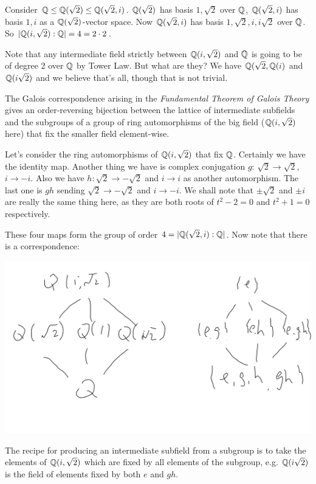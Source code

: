 \documentclass[a4paper]{article}
\begin{document}
\begin{eg}
Consider $\mathbb{Q} \leq \mathbb{Q}(\sqrt{2}) \leq \mathbb{Q}(\sqrt{2},i)$. $\mathbb{Q}(\sqrt{2})$ has basis $1,\sqrt{2}$ over $\mathbb{Q}$, $\mathbb{Q}(\sqrt{2},i)$ has basis $1,i$ as a $\mathbb{Q}(\sqrt{2})$-vector space. Now $\mathbb{Q}(\sqrt{2},i)$ has basis $1,\sqrt{2},i,i\sqrt{2}$ over $\mathbb{Q}$. So $|\mathbb{Q}(i,\sqrt{2}):\mathbb{Q}| = 4 = 2\cdot 2$.
\end{eg}

Note that any intermediate field strictly between $\mathbb{Q}(i,\sqrt{2})$ and $\mathbb{Q}$ is going to be of degree 2 over $\mathbb{Q}$ by Tower Law. But what are they? We have $\mathbb{Q}(\sqrt{2},\mathbb{Q}(i)$ and $\mathbb{Q}(i\sqrt{2})$ and we believe that's all, though that is not trivial.

The Galois correspondence arising in the \emph{Fundamental Theorem of Galois Theory} gives an order-reversing bijection between the lattice of intermediate subfields and the subgroups of a group of ring automorphisms of the big field ($\mathbb{Q}(i,\sqrt{2})$ here) that fix the smaller field element-wise.

Let's consider the ring automorphisms of $\mathbb{Q}(i,\sqrt{2})$ that fix $\mathbb{Q}$. Certainly we have the identity map. Another thing we have is complex conjugation $g$: $\sqrt{2} \to \sqrt{2}$, $i \to -i$. Also we have $h: \sqrt{2} \to -\sqrt{2}$ and $i \to i$ as another automorphism. The last one is $gh$ sending $\sqrt{2} \to -\sqrt{2}$ and $i \to -i$. We shall note that $\pm \sqrt{2}$ and $\pm i$ are really the same thing here, as they are both roots of $t^2-2=0$ and $t^2+1=0$ respectively.

These four maps form the group of order $4=|\mathbb{Q}(\sqrt{2},i):\mathbb{Q}|$. Now note that there is a correspondence:

\includegraphics[scale=0.4]{image/GT_01.png}

The recipe for producing an intermediate subfield from a subgroup is to take the elements of $\mathbb{Q}(i,\sqrt{2})$ which are fixed by all elements of the subgroup, e.g. $\mathbb{Q}(i\sqrt{2})$ is the field of elements fixed by both $e$ and $gh$.
\end{document}
